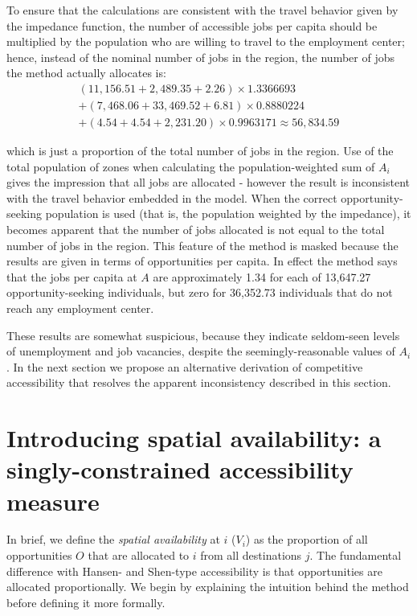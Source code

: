 \documentclass[]{elsarticle} %
\begin{document}
To ensure that the calculations are consistent with the travel behavior
given by the impedance function, the number of accessible jobs per
capita should be multiplied by the population who are willing to travel
to the employment center; hence, instead of the nominal number of jobs
in the region, the number of jobs the method actually allocates is: \[
\begin{array}{l}
(11,156.51 + 2,489.35 + 2.26)\times 1.3366693 \\
+ (7,468.06 + 33,469.52 + 6.81)\times 0.8880224\\
+ (4.54 + 4.54 + 2,231.20)\times 0.9963171 \approx 56,834.59
\end{array}
\]

\noindent which is just a proportion of the total number of jobs in the
region. Use of the total population of zones when calculating the
population-weighted sum of \(A_i\) gives the impression that all jobs
are allocated - however the result is inconsistent with the travel
behavior embedded in the model. When the correct opportunity-seeking
population is used (that is, the population weighted by the impedance),
it becomes apparent that the number of jobs allocated is not equal to
the total number of jobs in the region. This feature of the method is
masked because the results are given in terms of opportunities per
capita. In effect the method says that the jobs per capita at \(A\) are
approximately 1.34 for each of 13,647.27 opportunity-seeking
individuals, but zero for 36,352.73 individuals that do not reach any
employment center.

These results are somewhat suspicious, because they indicate seldom-seen
levels of unemployment and job vacancies, despite the
seemingly-reasonable values of \(A_i\). In the next section we propose
an alternative derivation of competitive accessibility that resolves the
apparent inconsistency described in this section.

\hypertarget{introducing-spatial-availability-a-singly-constrained-accessibility-measure}{%
\section{Introducing spatial availability: a singly-constrained
accessibility
measure}\label{introducing-spatial-availability-a-singly-constrained-accessibility-measure}}

In brief, we define the \emph{spatial availability} at \(i\) (\(V_{i}\))
as the proportion of all opportunities \(O\) that are allocated to \(i\)
from all destinations \(j\). The fundamental difference with Hansen- and
Shen-type accessibility is that opportunities are allocated
proportionally. We begin by explaining the intuition behind the method
before defining it more formally.
\end{document}
